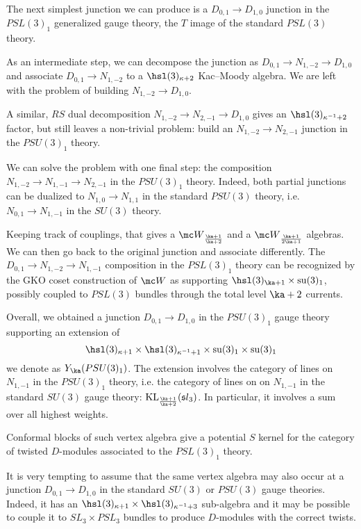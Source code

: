 \documentclass[11pt,reqno]{amsart}
\theoremstyle{plain}
\numberwithin{equation}{section}
\DeclareMathOperator{\tsu}{su}
\DeclareMathOperator{\KL}{KL}
\theoremstyle{definition}
\begin{document}
The next simplest junction we can produce is a $D_{0,1} \to D_{1,0}$ junction in 
the $PSL(3)_1$ generalized gauge theory, the $T$ image of the standard 
$PSL(3)$ theory. 

As an intermediate step, we can decompose the junction as 
$D_{0,1} \to N_{1,-2} \to D_{1,0}$ and associate $D_{0,1} \to N_{1,-2}$
to a $\hsl(3)_{\kappa+2}$ Kac--Moody algebra. We are left with the problem 
of building $N_{1,-2} \to D_{1,0}$. 

A similar, $RS$ dual decomposition $N_{1,-2} \to N_{2,-1}\to D_{1,0}$
gives an $\hsl(3)_{\kappa^{-1}+2}$ factor, but still leaves a non-trivial problem: 
build an $N_{1,-2} \to N_{2,-1}$ junction in the $PSU(3)_1$ theory. 

We can solve the problem with one final step: the composition 
$N_{1,-2} \to N_{1,-1} \to N_{2,-1}$ in the $PSU(3)_1$ theory.
Indeed, both partial junctions can be dualized to  
$N_{1,0} \to N_{1,1}$ in the standard $PSU(3)$ theory,
i.e. $N_{0,1} \to N_{1,-1}$ in the $SU(3)$ theory. 

Keeping track of couplings, that gives a ${\mc W}_{\frac{\ka+1}{\ka+2}}$ and a ${\mc W}_{\frac{\ka+1}{2 \ka+1}}$
algebras. We can then go back to the original junction and associate differently. 
The $D_{0,1} \to N_{1,-2}\to N_{1,-1}$ composition in the $PSL(3)_1$ theory
can be recognized by the GKO coset construction of ${\mc W}$ as supporting 
$\hsl(3)_{\ka+1} \times \tsu(3)_1$, possibly coupled to $PSL(3)$ 
bundles through the total level $\ka+2$ currents. 

Overall, we obtained a junction $D_{0,1} \to D_{1,0}$ in 
the $PSU(3)_1$ gauge theory supporting an extension of 
$$\hsl(3)_{\kappa+1} \times \hsl(3)_{\kappa^{-1}+1}\times \tsu(3)_1 \times \tsu(3)_1$$
we denote as $Y_\ka(PSU(3)_1)$. The extension involves the category of lines 
on $N_{1,-1}$ in the $PSU(3)_1$ theory, i.e. the category of lines on 
on $N_{1,-1}$ in the standard $SU(3)$ gauge theory: $\KL_{\frac{\ka+1}{\ka+2}}({\mathfrak sl}_3)$.
In particular, it involves a sum over all highest weights. 

Conformal blocks of such vertex algebra 
give a potential $S$ kernel for the category of 
twisted $D$-modules associated to the $PSL(3)_1$ theory.

It is very tempting to assume that the same vertex algebra may also occur at a junction 
$D_{0,1} \to D_{1,0}$ in the standard $SU(3)$ or $PSU(3)$ gauge theories. 
Indeed, it has an $\hsl(3)_{\kappa+1} \times \hsl(3)_{\kappa^{-1}+3}$ sub-algebra 
and it may be possible to couple it to $SL_3 \times PSL_3$ bundles to produce 
$D$-modules with the correct twists. 
\end{document}
